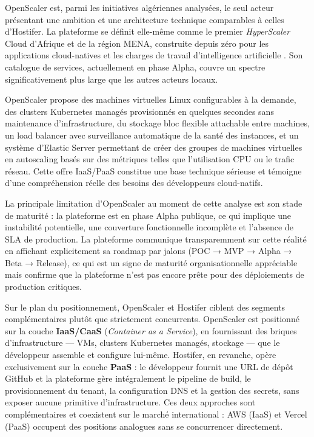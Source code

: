 OpenScaler est, parmi les initiatives algériennes analysées, le seul acteur présentant une ambition et une architecture technique comparables à celles d'Hostifer. La plateforme se définit elle-même comme le premier \textit{HyperScaler} Cloud d'Afrique et de la région MENA, construite depuis zéro pour les applications cloud-natives et les charges de travail d'intelligence artificielle \cite{openscaler-web}. Son catalogue de services, actuellement en phase Alpha, couvre un spectre significativement plus large que les autres acteurs locaux.

OpenScaler propose des machines virtuelles Linux configurables à la demande, des clusters Kubernetes managés provisionnés en quelques secondes sans maintenance d'infrastructure, du stockage bloc flexible attachable entre machines, un load balancer avec surveillance automatique de la santé des instances, et un système d'Elastic Server permettant de créer des groupes de machines virtuelles en autoscaling basés sur des métriques telles que l'utilisation CPU ou le trafic réseau.  Cette offre IaaS/PaaS constitue une base technique sérieuse et témoigne d'une compréhension réelle des besoins des développeurs cloud-natifs.

La principale limitation d'OpenScaler au moment de cette analyse est son stade de maturité : la plateforme est en phase Alpha publique, ce qui implique une instabilité potentielle, une couverture fonctionnelle incomplète et l'absence de SLA de production. La plateforme communique transparemment sur cette réalité en affichant explicitement sa roadmap par jalons (POC → MVP → Alpha → Beta → Release), ce qui est un signe de maturité organisationnelle appréciable mais confirme que la plateforme n'est pas encore prête pour des déploiements de production critiques.

Sur le plan du positionnement, OpenScaler et Hostifer ciblent des segments complémentaires plutôt que strictement concurrents. OpenScaler est positionné sur la couche \textbf{IaaS/CaaS} (\textit{Container as a Service}), en fournissant des briques d'infrastructure — VMs, clusters Kubernetes managés, stockage — que le développeur assemble et configure lui-même. Hostifer, en revanche, opère exclusivement sur la couche \textbf{PaaS} : le développeur fournit une URL de dépôt GitHub et la plateforme gère intégralement le pipeline de build, le provisionnement du tenant, la configuration DNS et la gestion des secrets, sans exposer aucune primitive d'infrastructure. Ces deux approches sont complémentaires et coexistent sur le marché international : AWS (IaaS) et Vercel (PaaS) occupent des positions analogues sans se concurrencer directement.

